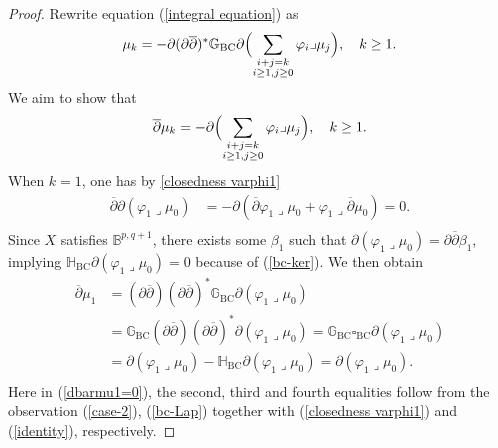 \documentclass[12pt]{amsart}
\numberwithin{equation}{section}
\theoremstyle{definition}
\theoremstyle{definition}
\theoremstyle{definition}
\renewcommand{\1}{\mathsf{1}}
\newcommand{\G}{\mathbb{G}}
\renewcommand{\>}{\rightarrow}
\newcommand{\p}{\partial}
\newcommand{\bp}{\overline\partial}
\renewcommand{\H}{\mathbb H}
\def\p{\partial}
\def\mb{\mathbb}
\def\v{\varphi}
\def\l{\lrcorner}
\theoremstyle{plain} %
\theoremstyle{plain} %
\theoremstyle{plain} %
\begin{document}
\begin{proof}
		Rewrite equation (\ref{integral equation}) as
\[
\mu_k = -\partial (\partial \overline{\partial})^* \G_{\mathrm{BC}} \partial \Bigl( \sum_{\substack{i+j=k \\ i \geq 1, j \geq 0}} \varphi_i \lrcorner \mu_j \Bigr), \quad k \geq 1.
\]
		We aim to show  that
	\begin{equation}\label{solve}
		\bp \mu_k = -\p \Bigl( \sum_{\substack{i+j=k \\ i \geq 1, j \geq 0}} \varphi_i \lrcorner \mu_j \Bigr), \quad k \geq 1.
	\end{equation}
		When $k=1$, one has by \eqref{closedness varphi1}
		$$\label{aaa}
		\begin{aligned}
			\bp\p(\v_1\l\mu_0)
			&=-\p(\bp\v_1\l\mu_0+\v_1\l\bp\mu_0)=0.\\
		\end{aligned}
		$$
		Since $X$ satisfies $\mb B^{p,q+1}$, there exists some $\beta_1$ such that $\p(\v_1\l\mu_0)=\p\bp \beta_1$, implying $\H_{\mathrm {BC}}\p(\v_1\l\mu_0)=0$ because of (\ref{bc-ker}). We then obtain
		\begin{equation}\label{dbarmu1=0}
			\begin{aligned}
				\bp\mu_1&={(\p\bp)\left(\p\bp\right)}^*\G_{\mathrm {BC}}\p(\v_1\l\mu_{0})\\
				&=\G_{\mathrm {BC}}{(\p\bp)\left(\p\bp\right)}^*\p(\v_1\l\mu_{0})=\G_{\mathrm {BC}}\square_{{\mathrm {BC}}}\p(\v_1\l\mu_{0})\\&=\p(\v_1\l\mu_{0})-\H_{\mathrm {BC}}\p(\v_1\l\mu_0)=\p(\v_1\l\mu_0).\\
			\end{aligned}
		\end{equation}
		Here in (\ref{dbarmu1=0}), the second, third and fourth  equalities follow from the observation (\ref{case-2}),  (\ref{bc-Lap}) together with (\ref{closedness varphi1})  and  (\ref{identity}), respectively.
        

\end{proof}
\end{document}
